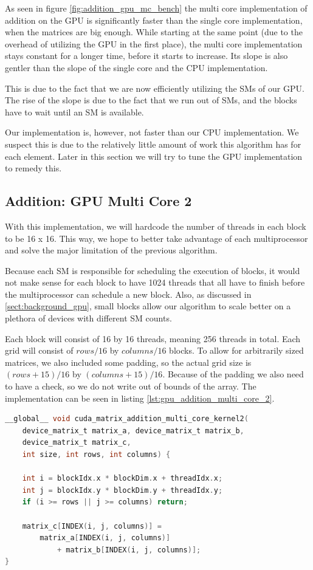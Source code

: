 As seen in figure \ref{fig:addition_gpu_mc_bench} the multi core implementation of addition on the GPU is significantly faster than the single core implementation, when the matrices are big enough. While starting at the same point (due to the overhead of utilizing the GPU in the first place), the multi core implementation stays constant for a longer time, before it starts to increase. Its slope is also gentler than the slope of the single core and the CPU implementation.

This is due to the fact that we are now efficiently utilizing the SMs of our GPU. The rise of the slope is due to the fact that we run out of SMs, and the blocks have to wait until an SM is available.

Our implementation is, however, not faster than our CPU implementation. We suspect this is due to the relatively little amount of work this algorithm has for each element. Later in this section we will try to tune the GPU implementation to remedy this.

\subsection{Addition: GPU Multi Core 2}

With this implementation, we will hardcode the number of threads in each block to be 16 x 16. This way, we hope to better take advantage of each multiprocessor and solve the major limitation of the previous algorithm.

Because each SM is responsible for scheduling the execution of blocks, it would not make sense for each block to have 1024 threads that all have to finish before the multiprocessor can schedule a new block. Also, as discussed in \ref{sect:background_gpu}, small blocks allow our algorithm to scale better on a plethora of devices with different SM counts.

Each block will consist of 16 by 16 threads, meaning 256 threads in total. Each grid will consist of $rows / 16$ by $columns / 16$ blocks. To allow for arbitrarily sized matrices, we also included some padding, so the actual grid size is $(rows + 15) / 16$ by $(columns + 15) / 16$. Because of the padding we also need to have a check, so we do not write out of bounds of the array. The implementation can be seen in listing \ref{lst:gpu_addition_multi_core_2}.

\begin{lstlisting}[language=C, caption={GPU addition multi core 2}, label={lst:gpu_addition_multi_core_2}]
__global__ void cuda_matrix_addition_multi_core_kernel2(
    device_matrix_t matrix_a, device_matrix_t matrix_b,
    device_matrix_t matrix_c, 
    int size, int rows, int columns) {
    
    int i = blockIdx.x * blockDim.x + threadIdx.x;
    int j = blockIdx.y * blockDim.y + threadIdx.y;
    if (i >= rows || j >= columns) return;

    matrix_c[INDEX(i, j, columns)] =
        matrix_a[INDEX(i, j, columns)] 
            + matrix_b[INDEX(i, j, columns)];
}
\end{lstlisting}

